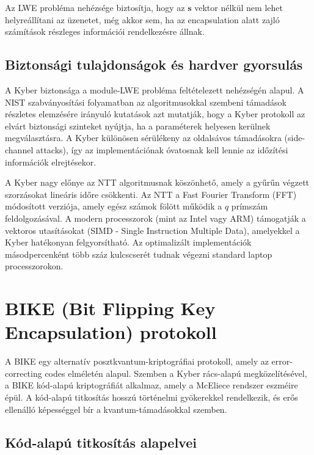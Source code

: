 Az LWE probléma nehézsége biztosítja, hogy az $\mathbf{s}$ vektor nélkül nem lehet helyreállítani 
az üzenetet, még akkor sem, ha az encapsulation alatt zajló számítások részleges információi 
rendelkezésre állnak.

\subsection{Biztonsági tulajdonságok és hardver gyorsulás}

A Kyber biztonsága a module-LWE probléma feltételezett nehézségén alapul. A NIST szabványosítási 
folyamatban az algoritmusokkal szembeni támadások részletes elemzésére 
irányuló kutatások azt mutatják, hogy a Kyber protokoll az elvárt biztonsági szinteket nyújtja, 
ha a paraméterek helyesen kerülnek megválasztásra. A Kyber különösen sérülékeny az oldalsávos 
támadásokra (side-channel attacks), így az implementációnak óvatosnak kell lennie az időzítési 
információk elrejtésekor.

A Kyber nagy előnye az NTT algoritmusnak köszönhető, amely a gyűrűn végzett szorzásokat 
lineáris időre csökkenti. Az NTT a Fast Fourier Transform (FFT) módosított verziója, amely 
egész számok fölött működik a $q$ prímszám feldolgozásával. A modern processzorok (mint az Intel vagy ARM) 
támogatják a vektoros utasításokat (SIMD - Single Instruction Multiple Data), amelyekkel a Kyber 
hatékonyan felgyorsítható. Az optimalizált implementációk másodpercenként több száz kulcscserét 
tudnak végezni standard laptop processzorokon.


\section{BIKE (Bit Flipping Key Encapsulation) protokoll}


A BIKE egy alternatív posztkvantum-kriptográfiai protokoll, amely az error-correcting codes elméletén 
alapul. Szemben a Kyber rács-alapú megközelítésével, a BIKE kód-alapú kriptográfiát alkalmaz, 
amely a McEliece rendszer eszméire épül. A kód-alapú titkosítás hosszú történelmi gyökerekkel rendelkezik, 
és erős ellenálló képességgel bír a kvantum-támadásokkal szemben.

\subsection{Kód-alapú titkosítás alapelvei}

